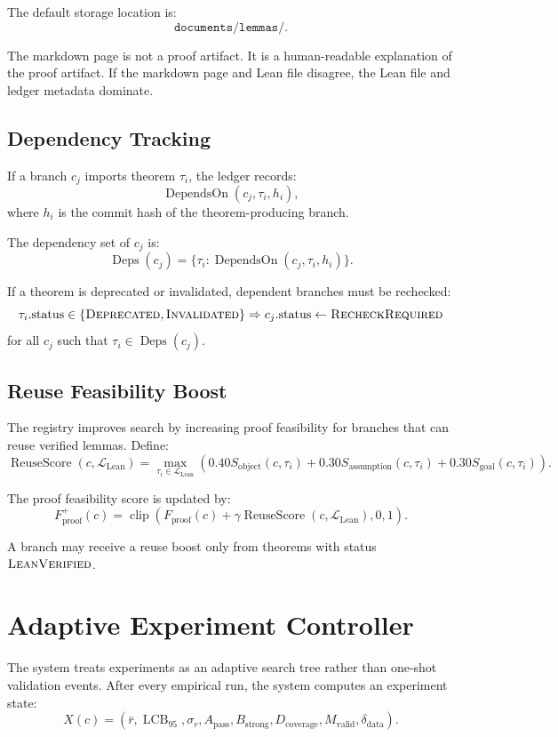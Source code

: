 \documentclass[11pt]{article}
\newcommand{\clip}{\operatorname{clip}}
\begin{document}
The default storage location is:
$$
\texttt{documents/lemmas/}.
$$

The markdown page is not a proof artifact. It is a human-readable explanation of the proof artifact. If the markdown page and Lean file disagree, the Lean file and ledger metadata dominate.

\subsection{Dependency Tracking}
If a branch $c_j$ imports theorem $\tau_i$, the ledger records:
$$
\operatorname{DependsOn}(c_j,\tau_i,h_i),
$$
where $h_i$ is the commit hash of the theorem-producing branch.

The dependency set of $c_j$ is:
$$
\operatorname{Deps}(c_j) = \{\tau_i:\operatorname{DependsOn}(c_j,\tau_i,h_i)\}.
$$

If a theorem is deprecated or invalidated, dependent branches must be rechecked:
$$
\tau_i.\text{status}\in\{\textsc{Deprecated},\textsc{Invalidated}\} \Rightarrow c_j.\text{status}\leftarrow\textsc{RecheckRequired}
$$
for all $c_j$ such that $\tau_i\in\operatorname{Deps}(c_j)$.

\subsection{Reuse Feasibility Boost}
The registry improves search by increasing proof feasibility for branches that can reuse verified lemmas. Define:
$$
\operatorname{ReuseScore}(c,\mathcal{L}_{\text{Lean}}) = \max_{\tau_i\in\mathcal{L}_{\text{Lean}}} \left( 0.40S_{\text{object}}(c,\tau_i) + 0.30S_{\text{assumption}}(c,\tau_i) + 0.30S_{\text{goal}}(c,\tau_i) \right).
$$

The proof feasibility score is updated by:
$$
F_{\text{proof}}^{+}(c) = \clip \left( F_{\text{proof}}(c) + \gamma\operatorname{ReuseScore}(c,\mathcal{L}_{\text{Lean}}), 0, 1 \right).
$$

A branch may receive a reuse boost only from theorems with status $\textsc{LeanVerified}$.

\section{Adaptive Experiment Controller}

The system treats experiments as an adaptive search tree rather than one-shot validation events. After every empirical run, the system computes an experiment state:
$$
X(c) = (\bar{r}, \operatorname{LCB}_{95}, \sigma_r, A_{\text{pass}}, B_{\text{strong}}, D_{\text{coverage}}, M_{\text{valid}}, \delta_{\text{data}}).
$$
\end{document}
